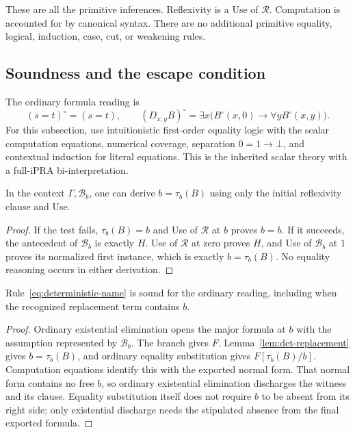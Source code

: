 These are all the primitive inferences. Reflexivity is a Use of
$\mathcal R$. Computation is accounted for by canonical syntax. There
are no additional primitive equality, logical, induction, case, cut, or
weakening rules.

\subsection{Soundness and the escape condition}

The ordinary formula reading is
\[
 (s=t)^\circ=(s=t),\qquad
 (D_{x,y}B)^\circ=
       \exists x\bigl(B^\circ(x,0)\to\forall y B^\circ(x,y)\bigr).
\]
For this subsection, use intuitionistic first-order equality logic with
the scalar computation equations, numerical coverage, separation
$0=1\to\bot$, and contextual induction for literal equations.
This is the inherited scalar theory with a full-iPRA bi-interpretation.

\begin{lemma}
\label{lem:det-replacement}
In the context $\Gamma,\mathcal B_b$, one can derive
$b=\tau_b(B)$ using only the initial reflexivity clause and Use.
\end{lemma}
\begin{proof}
If the test fails, $\tau_b(B)=b$ and Use of $\mathcal R$ at $b$ proves
$b=b$. If it succeeds, the antecedent of $\mathcal B_b$ is exactly
$H$. Use of $\mathcal R$ at zero proves $H$, and Use of $\mathcal B_b$
at $1$ proves its normalized first instance, which is exactly
$b=\tau_b(B)$. No equality reasoning occurs in either derivation.
\end{proof}

\begin{proposition}
Rule~\eqref{eq:deterministic-name} is sound for the ordinary reading,
including when the recognized replacement term contains $b$.
\end{proposition}
\begin{proof}
Ordinary existential elimination opens the major formula at $b$ with
the assumption represented by $\mathcal B_b$. The branch gives $F$.
Lemma~\ref{lem:det-replacement} gives $b=\tau_b(B)$, and ordinary equality
substitution gives $F[\tau_b(B)/b]$. Computation equations identify this
with the exported normal form. That normal form contains no free $b$,
so ordinary existential elimination discharges the witness and its clause.
Equality substitution itself does not require $b$ to be absent from its
right side; only existential discharge needs the stipulated absence from
the final exported formula.
\end{proof}

